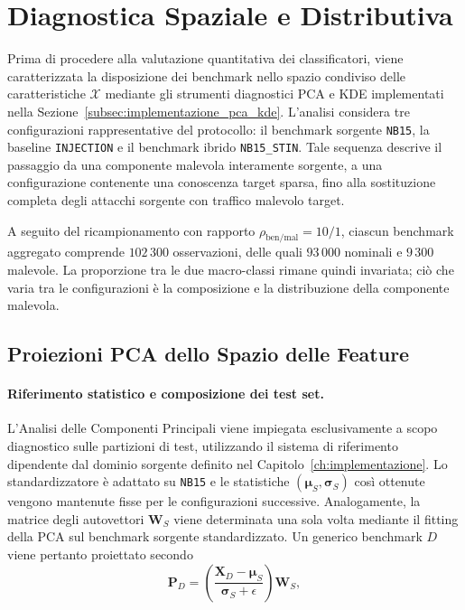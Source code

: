 
\section{Diagnostica Spaziale e Distributiva}
\label{sec:diagnostica_spaziale_distributiva}

Prima di procedere alla valutazione quantitativa dei classificatori, viene caratterizzata la disposizione dei benchmark nello spazio condiviso delle caratteristiche $\mathcal{X}$ mediante gli strumenti diagnostici PCA e KDE implementati nella Sezione~\ref{subsec:implementazione_pca_kde}.
L'analisi considera tre configurazioni rappresentative del protocollo: il benchmark sorgente \texttt{NB15}, la baseline \texttt{INJECTION} e il benchmark ibrido \texttt{NB15\_STIN}. 
Tale sequenza descrive il passaggio da una componente malevola interamente sorgente, a una configurazione contenente una conoscenza target sparsa, fino alla sostituzione completa degli attacchi sorgente con traffico malevolo target.

A seguito del ricampionamento con rapporto $\rho_{\mathrm{ben}/\mathrm{mal}}=10/1$, ciascun benchmark aggregato comprende $102\,300$ osservazioni, delle quali $93\,000$ nominali e $9\,300$ malevole.
La proporzione tra le due macro-classi rimane quindi invariata; ciò che varia tra le configurazioni è la composizione e la distribuzione della componente malevola.



\subsection{Proiezioni PCA dello Spazio delle Feature}
\label{subsec:proiezioni_pca}

\paragraph{Riferimento statistico e composizione dei test set.}
L'Analisi delle Componenti Principali viene impiegata esclusivamente a scopo diagnostico sulle partizioni di test, utilizzando il sistema di riferimento dipendente dal dominio sorgente definito nel Capitolo~\ref{ch:implementazione}. 
Lo standardizzatore è adattato su \texttt{NB15} e le statistiche $(\boldsymbol{\mu}_{S},\boldsymbol{\sigma}_{S})$ così ottenute vengono mantenute fisse per le configurazioni successive. Analogamente, la matrice degli autovettori $\mathbf{W}_{S}$ viene determinata una sola volta mediante il fitting della PCA sul benchmark sorgente standardizzato. Un generico benchmark $D$ viene pertanto proiettato secondo
\begin{equation}
    \mathbf{P}_{D}
    =
    \left(
        \frac{\mathbf{X}_{D}-\boldsymbol{\mu}_{S}}
             {\boldsymbol{\sigma}_{S}+\epsilon}
    \right)
    \mathbf{W}_{S},
\end{equation}

